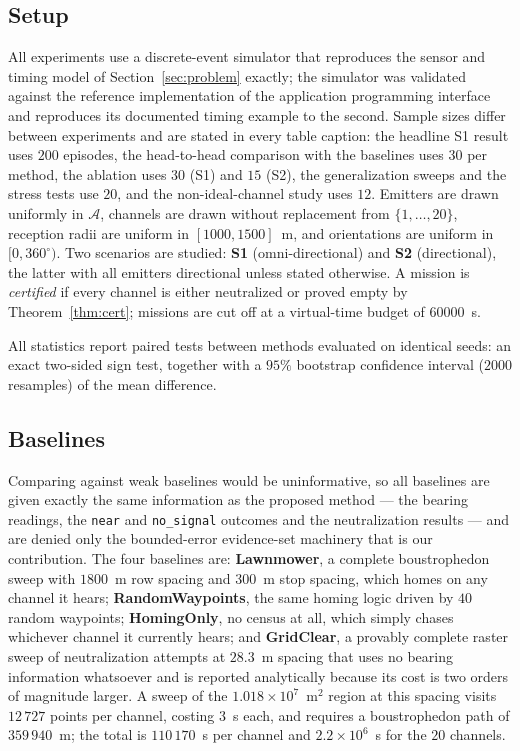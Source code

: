 \documentclass[preprint,12pt,3p]{elsarticle}
\theoremstyle{definition}
\newcommand{\bA}{\mathcal{A}}
\begin{document}
\subsection{Setup}
All experiments use a discrete-event simulator that reproduces the sensor and timing model of
Section~\ref{sec:problem} exactly; the simulator was validated against the reference
implementation of the application programming interface and reproduces its documented timing
example to the second. Sample sizes differ between experiments and are stated in every table caption: the headline
S1 result uses $200$ episodes, the head-to-head comparison with the baselines uses $30$ per method,
the ablation uses $30$ (S1) and $15$ (S2), the generalization sweeps and the stress tests use $20$,
and the non-ideal-channel study uses $12$. Emitters are drawn uniformly in $\bA$, channels are
drawn without replacement from $\{1,\dots,20\}$, reception radii are uniform in $[1000,1500]$~m,
and orientations are uniform in $[0,360^\circ)$. Two scenarios are studied: \textbf{S1}
(omni-directional) and \textbf{S2} (directional), the latter with all emitters directional unless
stated otherwise. A mission is \emph{certified} if every channel is either neutralized or proved
empty by Theorem~\ref{thm:cert}; missions are cut off at a virtual-time budget of $60000$~s.

All statistics report paired tests between methods evaluated on identical seeds: an exact
two-sided sign test, together with a $95\%$ bootstrap confidence interval ($2000$ resamples) of
the mean difference.

\subsection{Baselines}
\label{sec:maincmp}
Comparing against weak baselines would be uninformative, so all baselines are given exactly the
same information as the proposed method --- the bearing readings, the \texttt{near} and
\texttt{no\_signal} outcomes and the neutralization results --- and are denied only the
bounded-error evidence-set machinery that is our contribution. The four baselines are:
\textbf{Lawnmower}, a complete boustrophedon sweep with $1800$~m row spacing and $300$~m stop
spacing, which homes on any channel it hears; \textbf{RandomWaypoints}, the same homing logic
driven by $40$ random waypoints; \textbf{HomingOnly}, no census at all, which simply chases
whichever channel it currently hears; and \textbf{GridClear}, a provably complete raster sweep of
neutralization attempts at $28.3$~m spacing that uses no bearing information whatsoever and is
reported analytically because its cost is two orders of magnitude larger. A sweep of the
$1.018\times10^7$~m$^2$ region at this spacing visits $12\,727$ points per channel, costing
$3$~s each, and requires a boustrophedon path of $359\,940$~m; the total is
$110\,170$~s per channel and $2.2\times10^6$~s for the $20$ channels.
\end{document}
